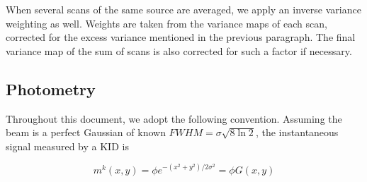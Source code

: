 
When several scans of the same source are averaged, we apply an inverse
variance weighting as well. Weights are taken from the variance maps of each scan,
corrected for the excess variance mentioned in the previous paragraph. The
final variance map of the sum of scans is also corrected for such a factor if necessary.

\subsection{Photometry}
\label{se:intro_photometry}

Throughout this document, we adopt the following convention. Assuming the beam
is a perfect Gaussian of known $FWHM=\sigma\sqrt{8\ln 2}$, the instantaneous
signal measured by a KID is

\begin{equation}
m^k(x,y) = \phi e^{-(x^2+y^2)/2\sigma^2} = \phi G(x,y)
\label{eq:flux_per_beam_def}
\end{equation}

